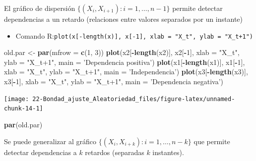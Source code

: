 \documentclass[
]{book}
\newenvironment{Shaded}{\begin{snugshade}}{\end{snugshade}}
\newcommand{\DataTypeTok}[1]{\textcolor[rgb]{0.13,0.29,0.53}{#1}}
\newcommand{\DecValTok}[1]{\textcolor[rgb]{0.00,0.00,0.81}{#1}}
\newcommand{\KeywordTok}[1]{\textcolor[rgb]{0.13,0.29,0.53}{\textbf{#1}}}
\newcommand{\NormalTok}[1]{#1}
\newcommand{\OperatorTok}[1]{\textcolor[rgb]{0.81,0.36,0.00}{\textbf{#1}}}
\newcommand{\StringTok}[1]{\textcolor[rgb]{0.31,0.60,0.02}{#1}}
\providecommand{\tightlist}{%
  \setlength{\itemsep}{0pt}\setlength{\parskip}{0pt}}
\theoremstyle{break}
\theoremstyle{definition}
\theoremstyle{definition}
\theoremstyle{definition}
\theoremstyle{remark}
\begin{document}
El gráfico de dispersión \(\{(X_{i},X_{i+1}) : i = 1, \ldots, n-1 \}\) permite
detectar dependencias a un retardo (relaciones entre valores separados
por un instante)

\begin{itemize}
\tightlist
\item
  Comando R:\texttt{plot(x{[}-length(x){]},\ x{[}-1{]},\ xlab\ =\ "X\_t",\ ylab\ =\ "X\_t+1")}
\end{itemize}

\begin{Shaded}
\begin{Highlighting}[]
\NormalTok{old.par <-}\StringTok{ }\KeywordTok{par}\NormalTok{(}\DataTypeTok{mfrow =} \KeywordTok{c}\NormalTok{(}\DecValTok{1}\NormalTok{, }\DecValTok{3}\NormalTok{))}
\KeywordTok{plot}\NormalTok{(x2[}\OperatorTok{-}\KeywordTok{length}\NormalTok{(x2)], x2[}\OperatorTok{-}\DecValTok{1}\NormalTok{], }\DataTypeTok{xlab =} \StringTok{"X_t"}\NormalTok{, }\DataTypeTok{ylab =} \StringTok{"X_t+1"}\NormalTok{, }\DataTypeTok{main =} \StringTok{'Dependencia positiva'}\NormalTok{)}
\KeywordTok{plot}\NormalTok{(x1[}\OperatorTok{-}\KeywordTok{length}\NormalTok{(x1)], x1[}\OperatorTok{-}\DecValTok{1}\NormalTok{], }\DataTypeTok{xlab =} \StringTok{"X_t"}\NormalTok{, }\DataTypeTok{ylab =} \StringTok{"X_t+1"}\NormalTok{, }\DataTypeTok{main =} \StringTok{'Independencia'}\NormalTok{)}
\KeywordTok{plot}\NormalTok{(x3[}\OperatorTok{-}\KeywordTok{length}\NormalTok{(x3)], x3[}\OperatorTok{-}\DecValTok{1}\NormalTok{], }\DataTypeTok{xlab =} \StringTok{"X_t"}\NormalTok{, }\DataTypeTok{ylab =} \StringTok{"X_t+1"}\NormalTok{, }\DataTypeTok{main =} \StringTok{'Dependencia negativa'}\NormalTok{)}
\end{Highlighting}
\end{Shaded}

\begin{center}\texttt{[image: 22-Bondad\_ajuste\_Aleatoriedad\_files/figure-latex/unnamed-chunk-14-1]} \end{center}

\begin{Shaded}
\begin{Highlighting}[]
\KeywordTok{par}\NormalTok{(old.par)}
\end{Highlighting}
\end{Shaded}

Se puede generalizar al gráfico \(\{(X_{i},X_{i+k}) : i = 1, \ldots, n-k \}\)
que permite detectar dependencias a \(k\) retardos
(separadas \(k\) instantes).
\end{document}
